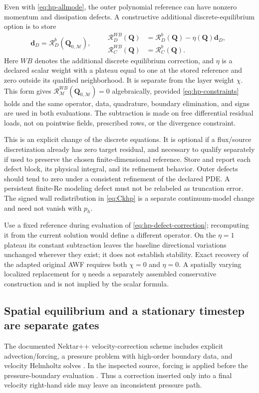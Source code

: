 \documentclass[11pt,a4paper]{article}
\numberwithin{equation}{section}
\begin{document}
Even with \cref{eq:hp-allmode}, the outer polynomial reference can have
nonzero momentum and dissipation defects. A constructive additional
discrete-equilibrium option is to store
\begin{equation}
 \bm d_D=\mathcal R_D^b(\bm Q_{0,\mathcal M}),\qquad
 \boxed{
 \begin{aligned}
 \mathcal R_D^{WB}(\bm Q)
  &=\mathcal R_D^b(\bm Q)-\eta(\bm Q)\bm d_D,\\
 \mathcal R_C^{WB}(\bm Q)&=\mathcal R_C^b(\bm Q).
 \end{aligned}}
 \label{eq:hp-defect-correction}
\end{equation}
Here $WB$ denotes the additional discrete equilibrium correction,
and $\eta$ is a declared scalar weight with a plateau equal to one at
the stored reference and zero outside its qualified neighborhood.
It is separate from the layer weight $\chi$. This form gives
$\mathcal R^{WB}_{\mathcal M}(\bm Q_{0,\mathcal M})=0$ algebraically,
provided \cref{eq:hp-constraints} holds and the same operator, data,
quadrature, boundary elimination, and signs are used in both evaluations.
The subtraction is made on free differential residual loads, not on
pointwise fields, prescribed rows, or the divergence constraint.

This is an explicit change of the discrete equations. It is optional
if a flux/source discretization already has zero target residual, and
necessary to qualify separately if used to preserve the chosen
finite-dimensional reference. Store and report each defect block, its
physical integral, and its refinement behavior. Outer defects should
tend to zero under a consistent refinement of the declared PDE.
A persistent finite-Re modeling defect must not be relabeled as
truncation error. The signed wall redistribution in \cref{eq:Ckhp}
is a separate continuum-model change and need not vanish with $p_h$.

Use a fixed reference during evaluation of \cref{eq:hp-defect-correction};
recomputing it from the current solution would define a different
operator. On the $\eta=1$ plateau its constant subtraction leaves the
baseline directional variations unchanged wherever they exist; it
does not establish stability. Exact recovery of the adapted original
AWF requires both $\chi=0$ and $\eta=0$. A spatially varying localized
replacement for $\eta$ needs a separately assembled conservative
construction and is not implied by the scalar formula.

\subsection{Spatial equilibrium and a stationary timestep are separate gates}
The documented Nektar++ velocity-correction scheme includes explicit
advection/forcing, a pressure problem with high-order boundary data,
and velocity Helmholtz solves \cite{NektarTheory}. In the inspected
source, forcing is applied before the pressure-boundary evaluation
\cite{NektarVCS}. Thus a correction inserted only into a final velocity
right-hand side may leave an inconsistent pressure path.
\end{document}
